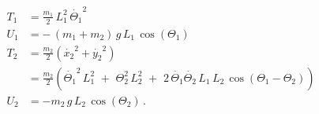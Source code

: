 \begin{equation}
	 \begin{split}
 		T_1 &= \frac{m_1}{2}\, L_1^2\, \dot{\Theta_1}^2 \\
 		U_1 &= -\,(m_1+m_2)\,g\,L_1\,\cos(\Theta_1) \\
 		T_2 &= \frac{m_2}{2} \left( \dot{x_2}^2 + \dot{y_2}^2 \right) \\
 			&= \frac{m_2}{2} \left( \dot{\Theta_1}^2\,L_1^2\,\,+\,\,\Theta_2^2\,L_2^2\,\,+\,\,2\,\dot{\Theta_1}\dot{\Theta_2}\,L_1\,L_2\,\cos(\Theta_1-\Theta_2)\right)\\
 		U_2 &= -m_2\,g\,L_2\,\cos(\Theta_2) \,. \\
	 \end{split}
	 \label{eq:Energiebetraege}
\end{equation}

